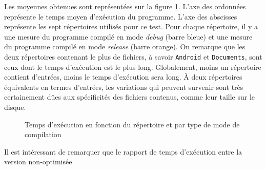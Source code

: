 \bigbreak
Les moyennes obtenues sont représentées sur la figure \ref{histo}. L'axe des ordonnées représente le temps 
moyen d'exécution du programme. L'axe des abscisses représente les sept répertoires utilisés pour ce test. 
Pour chaque répertoire, il y a une mesure du programme compilé en mode \textit{debug} (barre bleue) 
et une mesure du programme compilé en mode \textit{release} (barre orange). On remarque que les 
deux répertoires contenant le plus de fichiers, à savoir \texttt{Android} et 
\texttt{Documents}, sont ceux dont le temps d'exécution est le plus long. Globalement, 
moins un répertoire contient d'entrées, moins le temps d'exécution sera long. À deux répertoires 
équivalents en termes d'entrées, les variations qui peuvent survenir sont très certainement dûes 
aux spécificités des fichiers contenus, comme leur taille sur le disque.
\begin{figure}
    \begin{center}
    \end{center}
    \caption{Temps d'exécution en fonction du répertoire et par type de mode de compilation}
    \label{histo}
\end{figure}
Il est intéressant de remarquer que le rapport de temps d'exécution entre la version non-optimisée 
